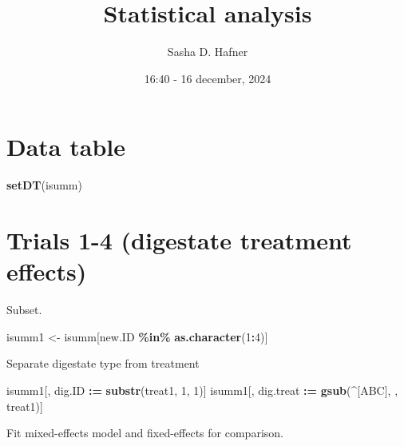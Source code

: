 \documentclass[
]{article}
\title{Statistical analysis}
\author{Sasha D. Hafner}
\date{16:40 - 16 december, 2024}
\newenvironment{Shaded}{\begin{snugshade}}{\end{snugshade}}
\newcommand{\DecValTok}[1]{\textcolor[rgb]{0.00,0.00,0.81}{#1}}
\newcommand{\FunctionTok}[1]{\textcolor[rgb]{0.13,0.29,0.53}{\textbf{#1}}}
\newcommand{\NormalTok}[1]{#1}
\newcommand{\OtherTok}[1]{\textcolor[rgb]{0.56,0.35,0.01}{#1}}
\newcommand{\SpecialCharTok}[1]{\textcolor[rgb]{0.81,0.36,0.00}{\textbf{#1}}}
\newcommand{\StringTok}[1]{\textcolor[rgb]{0.31,0.60,0.02}{#1}}
\begin{document}
\maketitle

\section{Data table}\label{data-table}

\begin{Shaded}
\begin{Highlighting}[]
\FunctionTok{setDT}\NormalTok{(isumm)}
\end{Highlighting}
\end{Shaded}

\section{Trials 1-4 (digestate treatment
effects)}\label{trials-1-4-digestate-treatment-effects}

Subset.

\begin{Shaded}
\begin{Highlighting}[]
\NormalTok{isumm1 }\OtherTok{\textless{}{-}}\NormalTok{ isumm[new.ID }\SpecialCharTok{\%in\%} \FunctionTok{as.character}\NormalTok{(}\DecValTok{1}\SpecialCharTok{:}\DecValTok{4}\NormalTok{)]}
\end{Highlighting}
\end{Shaded}

Separate digestate type from treatment

\begin{Shaded}
\begin{Highlighting}[]
\NormalTok{isumm1[, dig.ID }\SpecialCharTok{:=} \FunctionTok{substr}\NormalTok{(treat1, }\DecValTok{1}\NormalTok{, }\DecValTok{1}\NormalTok{)]}
\NormalTok{isumm1[, dig.treat }\SpecialCharTok{:=} \FunctionTok{gsub}\NormalTok{(}\StringTok{\textquotesingle{}\^{}[ABC]\textquotesingle{}}\NormalTok{, }\StringTok{\textquotesingle{}\textquotesingle{}}\NormalTok{, treat1)]}
\end{Highlighting}
\end{Shaded}

Fit mixed-effects model and fixed-effects for comparison.
\end{document}
